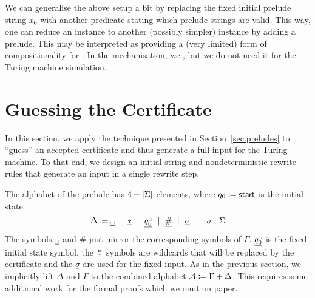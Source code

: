 \begin{remark}
  We can generalise the above setup a bit by replacing the fixed initial prelude string $x_0$ with another predicate stating which prelude strings are valid. This way, one can reduce an \expr{} instance to another (possibly simpler) \expr{} instance by adding a prelude.
  This may be interpreted as providing a (very limited) form of compositionality for \PR{}. 
  In the mechanisation, we , but we do not need it for the Turing machine simulation.
\end{remark}

\section{Guessing the Certificate}
In this section, we apply the technique presented in Section~\ref{sec:preludes} to ``guess'' an accepted certificate and thus generate a full input for the Turing machine. To that end, we design an initial string and nondeterministic rewrite rules that generate an input in a single rewrite step.

\newcommand{\nblank}{\ensuremath{\underline{\blank}}}
\newcommand{\ndelim}{\ensuremath{\underline{\#}}}
\newcommand{\nstar}{\ensuremath{\underline{*}}}
\newcommand{\ninit}{\ensuremath{\underline{q_0^{\blank}}}}
\newcommand{\nsig}[1]{\ensuremath{\underline{#1}}}

\newcommand{\initStr}{\textsf{initStr}}
\newcommand{\Rprelude}{\ensuremath{R_{\text{prelude}}}}

The alphabet \mnotec[preludeSig']{$\Delta$} of the prelude has $4 + |\Sigma|$ elements, where $q_0 \coloneqq \textsf{start}$ is the initial state.
\[\Delta \defeq \nblank \bnfmid \nstar \bnfmid \ninit \bnfmid \ndelim \bnfmid \nsig{\sigma} \qquad \sigma : \Sigma\]
The symbols $\nblank$ and $\ndelim$ just mirror the corresponding symbols of $\Gamma$. $\ninit$ is the fixed initial state symbol, the $\nstar$ symbols are wildcards that will be replaced by the certificate and the $\nsig{\sigma}$ are used for the fixed input. 
As in the previous section, we implicitly lift $\Delta$ and $\Gamma$ to the combined alphabet $\mathcal{A}\coloneqq \Gamma + \Delta$. This requires some additional work for the formal proofs which we omit on paper.


